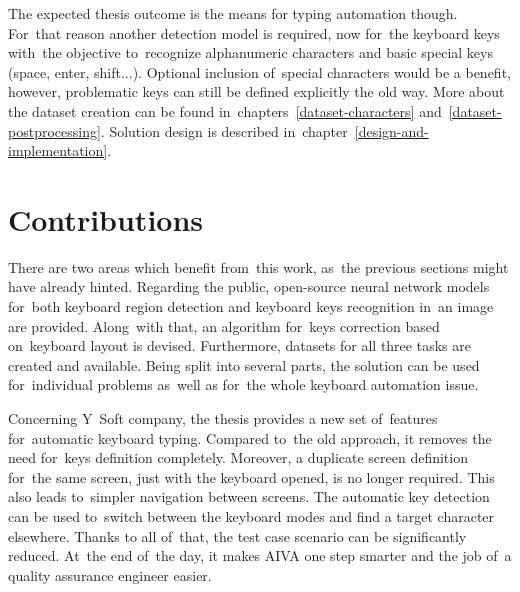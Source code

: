 The expected thesis outcome is the means for typing automation though. For~that reason another detection model is required, now for~the keyboard keys with~the objective to~recognize alphanumeric characters and basic special keys (space, enter, shift...). Optional inclusion of~special characters would be a benefit, however, problematic keys can still be defined explicitly the old way. More about the dataset creation can be found in~chapters~\ref{dataset-characters} and~\ref{dataset-postprocessing}. Solution design is described in~chapter~\ref{design-and-implementation}.

\section{Contributions}
\label{introduction-contributions}
There are two areas which benefit from~this work, as~the previous sections might have \mbox{already} hinted. Regarding the public, open-source neural network models for~both keyboard region detection and keyboard keys recognition in~an image are provided. Along~with that, an algorithm for~keys correction based on~keyboard layout is devised. Furthermore, datasets for all three tasks are created and available. Being split into several parts, the solution can be used for~individual problems as~well as for~the whole keyboard automation issue.

Concerning Y~Soft company, the thesis provides a new set of~features for~automatic keyboard typing. Compared to~the old approach, it removes the need for~keys definition completely. Moreover, a duplicate screen definition for~the same screen, just with the keyboard opened, is no longer required. This also leads to~simpler navigation between screens. The automatic key detection can be used to~switch between the keyboard modes and find a target character elsewhere. Thanks to all of~that, the test case scenario can be significantly reduced. At~the end of~the day, it makes AIVA one step smarter and the job of~a quality assurance engineer easier.